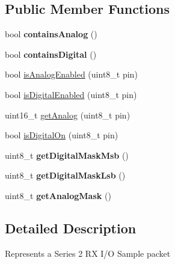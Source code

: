\subsection*{\-Public \-Member \-Functions}
\begin{DoxyCompactItemize}
\item 
\hypertarget{classZBRxIoSampleResponse_ae1e501e3e940a1b199955d5c938e8970}{bool {\bfseries contains\-Analog} ()}\label{classZBRxIoSampleResponse_ae1e501e3e940a1b199955d5c938e8970}

\item 
\hypertarget{classZBRxIoSampleResponse_a12d70fd07c66e37ea06d8ae92672d320}{bool {\bfseries contains\-Digital} ()}\label{classZBRxIoSampleResponse_a12d70fd07c66e37ea06d8ae92672d320}

\item 
bool \hyperlink{classZBRxIoSampleResponse_ad0e444cc8854c996517c1ecde033a9c8}{is\-Analog\-Enabled} (uint8\-\_\-t pin)
\item 
bool \hyperlink{classZBRxIoSampleResponse_a946c653da11f62b319c3ca6606f8edff}{is\-Digital\-Enabled} (uint8\-\_\-t pin)
\item 
uint16\-\_\-t \hyperlink{classZBRxIoSampleResponse_aa74edf46988bd3e50ce4037350cbb91e}{get\-Analog} (uint8\-\_\-t pin)
\item 
bool \hyperlink{classZBRxIoSampleResponse_ac94f045360d7dbb009ac16bc437cbbd5}{is\-Digital\-On} (uint8\-\_\-t pin)
\item 
\hypertarget{classZBRxIoSampleResponse_af15dc5e0954ece81bb28b33316ad0fcd}{uint8\-\_\-t {\bfseries get\-Digital\-Mask\-Msb} ()}\label{classZBRxIoSampleResponse_af15dc5e0954ece81bb28b33316ad0fcd}

\item 
\hypertarget{classZBRxIoSampleResponse_a2bc101d5276c92f09ebe3a2f370ad0c2}{uint8\-\_\-t {\bfseries get\-Digital\-Mask\-Lsb} ()}\label{classZBRxIoSampleResponse_a2bc101d5276c92f09ebe3a2f370ad0c2}

\item 
\hypertarget{classZBRxIoSampleResponse_a065e15e00c505045a13e95091a62fae5}{uint8\-\_\-t {\bfseries get\-Analog\-Mask} ()}\label{classZBRxIoSampleResponse_a065e15e00c505045a13e95091a62fae5}

\end{DoxyCompactItemize}


\subsection{\-Detailed \-Description}
\-Represents a \-Series 2 \-R\-X \-I/\-O \-Sample packet 

